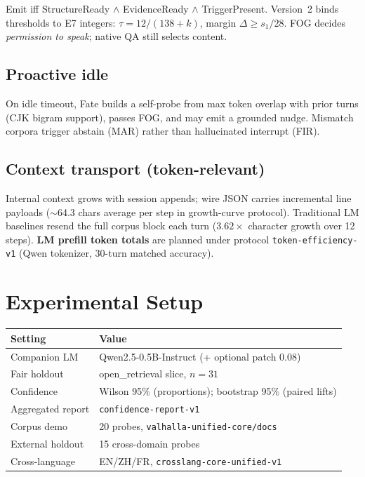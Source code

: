 \documentclass[11pt,a4paper]{article}
\begin{document}
Emit iff StructureReady $\wedge$ EvidenceReady $\wedge$ TriggerPresent. Version~2 binds thresholds to E7 integers: $\tau = 12/(138+k)$, margin $\Delta \ge s_1/28$. FOG decides \emph{permission to speak}; native QA still selects content.

\subsection{Proactive idle}

On idle timeout, Fate builds a self-probe from max token overlap with prior turns (CJK bigram support), passes FOG, and may emit a grounded nudge. Mismatch corpora trigger abstain (MAR) rather than hallucinated interrupt (FIR).

\subsection{Context transport (token-relevant)}

Internal context grows with session appends; wire JSON carries incremental line payloads ($\sim$64.3 chars average per step in growth-curve protocol). Traditional LM baselines resend the full corpus block each turn ($3.62\times$ character growth over 12 steps). \textbf{LM prefill token totals} are planned under protocol \texttt{token-efficiency-v1} (Qwen tokenizer, 30-turn matched accuracy).

\section{Experimental Setup}

\begin{table}[h]
\centering
\small
\begin{tabular}{ll}
\toprule
Setting & Value \\
\midrule
Companion LM & Qwen2.5-0.5B-Instruct (+ optional patch 0.08) \\
Fair holdout & open\_retrieval slice, $n=31$ \\
Confidence & Wilson 95\% (proportions); bootstrap 95\% (paired lifts) \\
Aggregated report & \texttt{confidence-report-v1} \\
Corpus demo & 20 probes, \texttt{valhalla-unified-core/docs} \\
External holdout & 15 cross-domain probes \\
Cross-language & EN/ZH/FR, \texttt{crosslang-core-unified-v1} \\
\bottomrule
\end{tabular}
\end{table}
\end{document}
